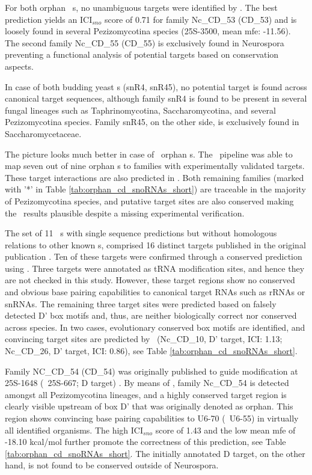 For both orphan \ncr\ \sno s, no unambiguous targets were identified by
\snostrip. The best prediction yields an ICI$_{sno}$ score of 0.71 for
family Nc\_CD\_53 (CD\_53) and is loosely found in several
Pezizomycotina species (25S-3500, mean mfe: -11.56). The second family
Nc\_CD\_55 (CD\_55) is exclusively found in Neurospora preventing a
functional analysis of potential targets based on conservation
aspects.

In case of both budding yeast \sno s (snR4, snR45), no potential
target is found across canonical target sequences, although family
snR4 is found to be present in several fungal lineages such as
Taphrinomycotina, Saccharomycotina, and several Pezizomycotina
species. Family snR45, on the other side, is exclusively found in
Saccharomycetaceae.

The picture looks much better in case of \afu\ orphan \sno s. The
\snostrip\ pipeline was able to map seven out of nine orphan \cd s to
families with experimentally validated targets. These target
interactions are also predicted in \afu. Both remaining families
(marked with '*' in Table \ref{tab:orphan_cd_snoRNAs_short}) are
traceable in the majority of Pezizomycotina species, and putative
target sites are also conserved making the \snostrip\ results
plausible despite a missing experimental verification.

The set of 11 \ncr\ \sno s with single sequence predictions but without
homologous relations to other known \sno s, comprised 16 distinct
targets published in the original publication \cite{Li:2005}.  Ten of
these targets were confirmed through a conserved prediction using
\snostrip.  Three targets were annotated as tRNA modification sites,
and hence they are not checked in this study. However, these target
regions show no conserved and obvious base pairing capabilities to
canonical target RNAs such as rRNAs or snRNAs. The remaining three
target sites were predicted based on falsely detected D' box motifs
and, thus, are neither biologically correct nor conserved across
species. In two cases, evolutionary conserved box motifs are
identified, and convincing target sites are predicted by \snostrip\
(Nc\_CD\_10, D' target, ICI: 1.13; Nc\_CD\_26, D' target, ICI: 0.86),
see Table \ref{tab:orphan_cd_snoRNAs_short}.

Family NC\_CD\_54 (CD\_54) was originally published to guide
modification at 25S-1648 (\ncr\ 25S-667; D target) \cite{Liu:2009}. By
means of \snostrip, family Nc\_CD\_54 is detected amongst all
Pezizomycotina lineages, and a highly conserved target region is
clearly visible upstream of box D' that was originally denoted as orphan. This
region shows convincing base pairing capabilities to U6-70 (\ncr\
U6-55) in virtually all identified organisms. The high ICI$_{sno}$
score of 1.43 and the low mean mfe of -18.10 kcal/mol further promote
the correctness of this prediction, see Table
\ref{tab:orphan_cd_snoRNAs_short}. The initially annotated D target,
on the other hand, is not found to be conserved outside of Neurospora.

